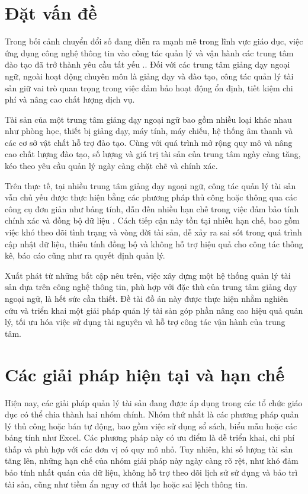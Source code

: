 \documentclass[../DoAn.tex]{subfiles}
\begin{document}
\section{Đặt vấn đề}
\label{sec:dvd}

Trong bối cảnh chuyển đổi số đang diễn ra mạnh mẽ trong lĩnh vực giáo dục, việc ứng dụng công nghệ thông tin vào công tác quản lý và vận hành các trung tâm đào tạo đã trở thành yêu cầu tất yếu \cite{laudon2020mis}.. Đối với các trung tâm giảng dạy ngoại ngữ, ngoài hoạt động chuyên môn là giảng dạy và đào tạo, công tác quản lý tài sản giữ vai trò quan trọng trong việc đảm bảo hoạt động ổn định, tiết kiệm chi phí và nâng cao chất lượng dịch vụ.

Tài sản của một trung tâm giảng dạy ngoại ngữ bao gồm nhiều loại khác nhau như phòng học, thiết bị giảng dạy, máy tính, máy chiếu, hệ thống âm thanh và các cơ sở vật chất hỗ trợ đào tạo. Cùng với quá trình mở rộng quy mô và nâng cao chất lượng đào tạo, số lượng và giá trị tài sản của trung tâm ngày càng tăng, kéo theo yêu cầu quản lý ngày càng chặt chẽ và chính xác.

Trên thực tế, tại nhiều trung tâm giảng dạy ngoại ngữ, công tác quản lý tài sản vẫn chủ yếu được thực hiện bằng các phương pháp thủ công hoặc thông qua các công cụ đơn giản như bảng tính, dẫn đến nhiều hạn chế trong việc đảm bảo tính chính xác và đồng bộ dữ liệu \cite{hutchins2019itasset, moller2018assettracking}. Cách tiếp cận này tồn tại nhiều hạn chế, bao gồm việc khó theo dõi tình trạng và vòng đời tài sản, dễ xảy ra sai sót trong quá trình cập nhật dữ liệu, thiếu tính đồng bộ và không hỗ trợ hiệu quả cho công tác thống kê, báo cáo cũng như ra quyết định quản lý.

Xuất phát từ những bất cập nêu trên, việc xây dựng một hệ thống quản lý tài sản dựa trên công nghệ thông tin, phù hợp với đặc thù của trung tâm giảng dạy ngoại ngữ, là hết sức cần thiết. Đề tài đồ án này được thực hiện nhằm nghiên cứu và triển khai một giải pháp quản lý tài sản góp phần nâng cao hiệu quả quản lý, tối ưu hóa việc sử dụng tài nguyên và hỗ trợ công tác vận hành của trung tâm.

\section{Các giải pháp hiện tại và hạn chế}
\label{sec:giaiphap}

Hiện nay, các giải pháp quản lý tài sản đang được áp dụng trong các tổ chức giáo dục có thể chia thành hai nhóm chính. Nhóm thứ nhất là các phương pháp quản lý thủ công hoặc bán tự động, bao gồm việc sử dụng sổ sách, biểu mẫu hoặc các bảng tính như Excel. Các phương pháp này có ưu điểm là dễ triển khai, chi phí thấp và phù hợp với các đơn vị có quy mô nhỏ. Tuy nhiên, khi số lượng tài sản tăng lên, những hạn chế của nhóm giải pháp này ngày càng rõ rệt, như khó đảm bảo tính nhất quán của dữ liệu, không hỗ trợ theo dõi lịch sử sử dụng và bảo trì tài sản, cũng như tiềm ẩn nguy cơ thất lạc hoặc sai lệch thông tin.
\end{document}
